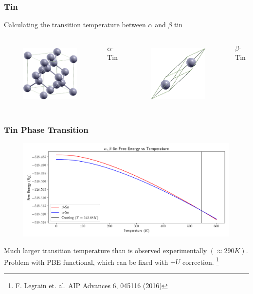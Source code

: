 \documentclass{beamer}
\begin{document}
\begin{frame}
\frametitle{Tin}
\begin{center}Calculating the transition temperature between $\alpha$ and $\beta$ tin\end{center}
\begin{columns}
	\begin{figure}[ht]
	\begin{center}
		\includegraphics[height=1.3in]{alphasn.png}
	\end{center}
	\end{figure}
	\begin{center}
		$\alpha$-Tin
	\end{center}
	\begin{figure}[ht]
	\begin{center}
		\includegraphics[height=1.3in]{betasn.png}
	\end{center}
	\end{figure}
	\begin{center}
		$\beta$-Tin
	\end{center}
\end{columns}
\end{frame}

\begin{frame}
	\frametitle{Tin Phase Transition}
	\begin{figure}[ht]
	\begin{center}
	\includegraphics[height=2in]{tin_transition_temperature.png}
	\end{center}
	\end{figure}
\pause
\begin{center}Much larger transition temperature than is observed experimentally $(\approx 290K)$. Problem with PBE functional, which can be fixed with $+U$ correction. \footnote{F. Legrain et. al. AIP Advances 6, 045116 (2016)}\end{center}
\end{frame}
\end{document}
